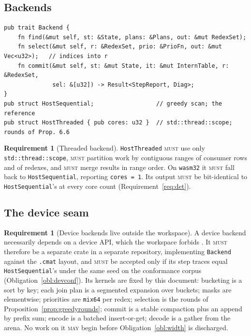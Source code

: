 \documentclass[11pt,a4paper]{article}
\newcommand{\code}[1]{\texttt{#1}}
\newcommand{\MUST}{\textsc{must}}
\newcommand{\MAY}{\textsc{may}}
\theoremstyle{definition}
\newtheorem{requirement}[definition]{Requirement}
\theoremstyle{plain}
\begin{document}
\subsection{Backends}

\begin{lstlisting}
pub trait Backend {
    fn find(&mut self, st: &State, plans: &Plans, out: &mut RedexSet);
    fn select(&mut self, r: &RedexSet, prio: &PrioFn, out: &mut Vec<u32>);   // indices into r
    fn commit(&mut self, st: &mut State, it: &mut InternTable, r: &RedexSet,
              sel: &[u32]) -> Result<StepReport, Diag>;
}
pub struct HostSequential;                  // greedy scan; the reference
pub struct HostThreaded { pub cores: u32 }  // std::thread::scope; rounds of Prop. 6.6
\end{lstlisting}

\begin{requirement}[Threaded backend]\label{req:threads}
\code{HostThreaded} \MUST{} use only \code{std::thread::scope}, \MUST{}
partition work by contiguous ranges of consumer rows and of redexes, and
\MUST{} merge results in range order. On \code{wasm32} it \MUST{} fall back to
\code{HostSequential}, reporting \code{cores = 1}. Its output \MUST{} be
bit-identical to \code{HostSequential}'s at every core count
(Requirement~\ref{req:det}).
\end{requirement}

\subsection{The device seam}\label{sec:device}

\begin{requirement}[Device backends live outside the workspace]
\label{req:device}
A device backend necessarily depends on a device API, which the workspace
forbids \cite[Req.~12.3]{combspec}. It \MUST{} therefore be a separate crate
in a separate repository, implementing \code{Backend} against the
\code{.cmat} layout, and \MUST{} be accepted only if its step traces equal
\code{HostSequential}'s under the same seed on the conformance corpus
(Obligation~\ref{obl:devconf}). Its kernels are fixed by this document:
bucketing is a sort by key; each join plan is a segmented expansion over
buckets; masks are elementwise; priorities are \code{mix64} per redex;
selection is the rounds of Proposition~\ref{prop:greedyrounds}; commit is a
stable compaction plus an append by prefix sum; encode is a batched
insert-or-get; decode is a gather from the arena. No work on it \MAY{} begin
before Obligation~\ref{obl:width} is discharged.
\end{requirement}
\end{document}
